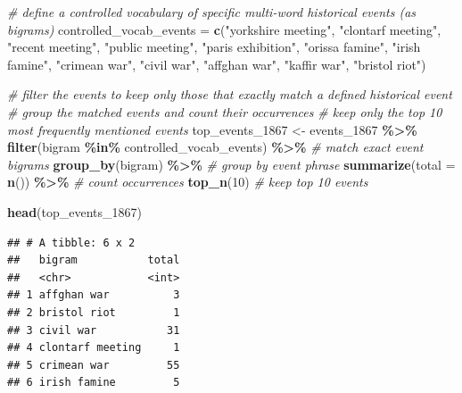 \documentclass[
]{article}
\newenvironment{Shaded}{\begin{snugshade}}{\end{snugshade}}
\newcommand{\AttributeTok}[1]{\textcolor[rgb]{0.13,0.29,0.53}{#1}}
\newcommand{\CommentTok}[1]{\textcolor[rgb]{0.56,0.35,0.01}{\textit{#1}}}
\newcommand{\DecValTok}[1]{\textcolor[rgb]{0.00,0.00,0.81}{#1}}
\newcommand{\FunctionTok}[1]{\textcolor[rgb]{0.13,0.29,0.53}{\textbf{#1}}}
\newcommand{\NormalTok}[1]{#1}
\newcommand{\OtherTok}[1]{\textcolor[rgb]{0.56,0.35,0.01}{#1}}
\newcommand{\SpecialCharTok}[1]{\textcolor[rgb]{0.81,0.36,0.00}{\textbf{#1}}}
\newcommand{\StringTok}[1]{\textcolor[rgb]{0.31,0.60,0.02}{#1}}
\begin{document}
\begin{Shaded}
\begin{Highlighting}[]
\CommentTok{\# define a controlled vocabulary of specific multi{-}word historical events (as bigrams)}
\NormalTok{controlled\_vocab\_events }\OtherTok{=} \FunctionTok{c}\NormalTok{(}\StringTok{"yorkshire meeting"}\NormalTok{, }\StringTok{"clontarf meeting"}\NormalTok{, }\StringTok{"recent meeting"}\NormalTok{,}
                            \StringTok{"public meeting"}\NormalTok{, }\StringTok{"paris exhibition"}\NormalTok{, }\StringTok{"orissa famine"}\NormalTok{,}
                            \StringTok{"irish famine"}\NormalTok{, }\StringTok{"crimean war"}\NormalTok{, }\StringTok{"civil war"}\NormalTok{, }\StringTok{"affghan war"}\NormalTok{,}
                            \StringTok{"kaffir war"}\NormalTok{, }\StringTok{"bristol riot"}\NormalTok{) }

\CommentTok{\# filter the events to keep only those that exactly match a defined historical event}
\CommentTok{\# group the matched events and count their occurrences}
\CommentTok{\# keep only the top 10 most frequently mentioned events}
\NormalTok{top\_events\_1867 }\OtherTok{\textless{}{-}}\NormalTok{ events\_1867 }\SpecialCharTok{\%\textgreater{}\%}
  \FunctionTok{filter}\NormalTok{(bigram }\SpecialCharTok{\%in\%}\NormalTok{ controlled\_vocab\_events) }\SpecialCharTok{\%\textgreater{}\%} \CommentTok{\# match exact event bigrams}
  \FunctionTok{group\_by}\NormalTok{(bigram) }\SpecialCharTok{\%\textgreater{}\%} \CommentTok{\# group by event phrase}
  \FunctionTok{summarize}\NormalTok{(}\AttributeTok{total =} \FunctionTok{n}\NormalTok{()) }\SpecialCharTok{\%\textgreater{}\%} \CommentTok{\# count occurrences}
  \FunctionTok{top\_n}\NormalTok{(}\DecValTok{10}\NormalTok{) }\CommentTok{\# keep top 10 events}

\FunctionTok{head}\NormalTok{(top\_events\_1867)}
\end{Highlighting}
\end{Shaded}

\begin{verbatim}
## # A tibble: 6 x 2
##   bigram           total
##   <chr>            <int>
## 1 affghan war          3
## 2 bristol riot         1
## 3 civil war           31
## 4 clontarf meeting     1
## 5 crimean war         55
## 6 irish famine         5
\end{verbatim}
\end{document}
